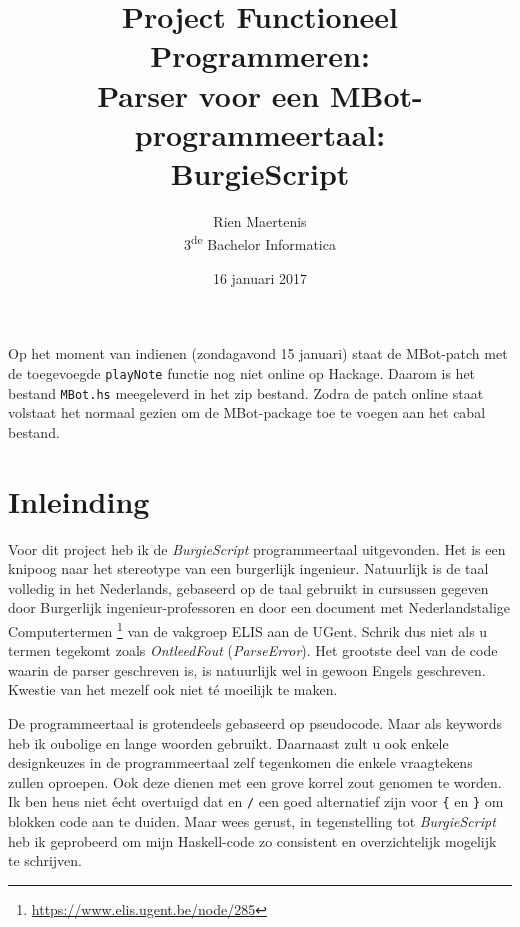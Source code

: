 \documentclass[11pt]{article}
\author{Rien Maertenis\\3\textsuperscript{de} Bachelor Informatica}
\title{Project Functioneel Programmeren:\\Parser voor een MBot-programmeertaal:\\\textbf{BurgieScript}}
\date{16 januari 2017}
\begin{document}
\maketitle

Op het moment van indienen (zondagavond 15 januari) staat de MBot-patch met de toegevoegde \texttt{playNote} functie nog niet online op Hackage. Daarom is het bestand \texttt{MBot.hs} meegeleverd in het zip bestand. Zodra de patch online staat volstaat het normaal gezien om de MBot-package toe te voegen aan het cabal bestand.

\section{Inleinding}
Voor dit project heb ik de \textit{BurgieScript} programmeertaal uitgevonden.
Het is een knipoog naar het stereotype van een burgerlijk ingenieur.
Natuurlijk is de taal volledig in het Nederlands, gebaseerd op de taal gebruikt
in cursussen gegeven door Burgerlijk ingenieur-professoren en door een document
met Nederlandstalige Computertermen
\footnote{\url{https://www.elis.ugent.be/node/285}} van de vakgroep ELIS aan de UGent.
Schrik dus niet als u termen tegekomt zoals \textit{OntleedFout} (\textit{ParseError}).
Het grootste deel van de code waarin de parser geschreven is, is natuurlijk wel
in gewoon Engels geschreven. Kwestie van het mezelf ook niet té moeilijk te maken.

De programmeertaal is grotendeels gebaseerd op pseudocode. Maar als keywords heb ik oubolige en lange woorden gebruikt. Daarnaast zult u ook enkele designkeuzes in de programmeertaal zelf tegenkomen die
enkele vraagtekens zullen oproepen. Ook deze dienen met een grove korrel zout genomen te worden. Ik ben heus niet écht overtuigd dat \texttt{} en
\texttt{/} een goed alternatief zijn voor \texttt{\{} en \texttt{\}} om blokken
code aan te duiden. Maar wees gerust, in tegenstelling tot \textit{BurgieScript}
heb ik geprobeerd om mijn Haskell-code zo consistent en overzichtelijk mogelijk
te schrijven.
\end{document}
